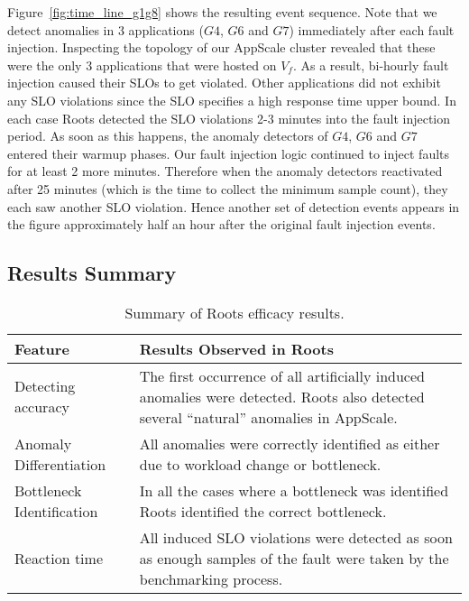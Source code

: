 Figure~\ref{fig:time_line_g1g8} shows the resulting event sequence. Note that we detect anomalies 
in 3 applications ($G4$, $G6$ and $G7$) immediately after each fault injection. Inspecting the 
topology of our AppScale cluster revealed that these were the only 3 applications that were 
hosted on $V_f$. As a result, bi-hourly fault injection caused their SLOs to
get violated. Other applications did not exhibit any SLO violations since 
the SLO specifies 
a high response time upper bound. In each case Roots detected the SLO violations 2-3 minutes into the fault injection
period. As soon as this happens, the anomaly detectors of $G4$, $G6$ and $G7$ entered their warmup phases.
Our fault injection logic continued to inject faults for at least 2 more minutes. 
Therefore when the anomaly detectors
reactivated after 25 minutes (which is the time to collect the minimum sample count), they each saw another SLO
violation. Hence another set of detection events appears in the figure
approximately half an hour after the
original fault injection events.

\subsection{Results Summary}

\begin{table}
\caption{Summary of Roots efficacy results.
\label{tab:results_summary}
}
{%
\begin{center}
\begin{tabular}{|p{1.9cm}|p{5.8cm}|}
\hline
Feature & Results Observed in Roots \\ \hline
Detecting accuracy &
The first occurrence of all artificially induced anomalies were detected.
Roots also detected several ``natural'' anomalies in AppScale. \\ \hline
Anomaly Differentiation &
All anomalies were correctly identified as either due to workload change or
bottleneck. \\ \hline
Bottleneck Identification &
In all the cases where a bottleneck was identified Roots identified the
correct bottleneck. \\ \hline
Reaction time &
All induced SLO violations were detected as soon
as enough samples of the fault
were taken by the benchmarking process. \\
\hline
\end{tabular}
\end{center}
}
\vspace{-0.1in}
\end{table}

